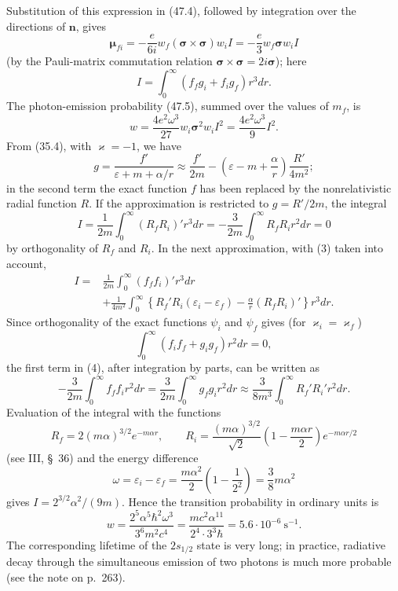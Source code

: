 Substitution of this expression in (47.4), followed by integration over the directions of $\mathbf n$, gives
\[
\boldsymbol\mu_{fi}=-\frac e{6i}w_f(\boldsymbol\sigma\times\boldsymbol\sigma)w_i I
=-\frac e3w_f\boldsymbol\sigma w_i I
\]
(by the Pauli-matrix commutation relation $\boldsymbol\sigma\times\boldsymbol\sigma=2i\boldsymbol\sigma$); here
\begin{equation}
I=\int_0^\infty(f_fg_i+f_ig_f)r^3dr.
\tag{1}
\end{equation}
The photon-emission probability (47.5), summed over the values of $m_f$, is
\begin{equation}
w=\frac{4e^2\omega^3}{27}w_i\boldsymbol\sigma^2w_iI^2
=\frac{4e^2\omega^3}{9}I^2.
\tag{2}
\end{equation}
From (35.4), with $\varkappa=-1$, we have
\[
g=\frac{f'}{\varepsilon+m+\alpha/r}
\approx\frac{f'}{2m}-\left(\varepsilon-m+\frac\alpha r\right)\frac{R'}{4m^2};
\]
in the second term the exact function $f$ has been replaced by the nonrelativistic radial function $R$. If the approximation is restricted to $g=R'/2m$, the integral
\begin{equation}
I=\frac1{2m}\int_0^\infty(R_fR_i)'r^3dr
=-\frac3{2m}\int_0^\infty R_fR_ir^2dr=0
\tag{3}
\end{equation}
by orthogonality of $R_f$ and $R_i$. In the next approximation, with (3) taken into account,
\begin{equation}
\begin{aligned}
I={}&\frac1{2m}\int_0^\infty(f_ff_i)'r^3dr\\
&+\frac1{4m^2}\int_0^\infty
\left\{R_f'R_i(\varepsilon_i-\varepsilon_f)
-\frac\alpha r(R_fR_i)'\right\}r^3dr.
\end{aligned}
\tag{4}
\end{equation}
Since orthogonality of the exact functions $\psi_i$ and $\psi_f$ gives (for $\varkappa_i=\varkappa_f$)
\[
\int_0^\infty(f_if_f+g_ig_f)r^2dr=0,
\]
the first term in (4), after integration by parts, can be written as
\[
-\frac3{2m}\int_0^\infty f_ff_ir^2dr
=\frac3{2m}\int_0^\infty g_fg_ir^2dr
\approx\frac3{8m^3}\int_0^\infty R_f'R_i'r^2dr.
\]
Evaluation of the integral with the functions
\[
R_f=2(m\alpha)^{3/2}e^{-m\alpha r},
\qquad
R_i=\frac{(m\alpha)^{3/2}}{\sqrt2}
\left(1-\frac{m\alpha r}{2}\right)e^{-m\alpha r/2}
\]
(see III, \S~36) and the energy difference
\[
\omega=\varepsilon_i-\varepsilon_f
=\frac{m\alpha^2}{2}\left(1-\frac1{2^2}\right)
=\frac38m\alpha^2
\]
gives $I=2^{3/2}\alpha^2/(9m)$. Hence the transition probability in ordinary units is
\[
w=\frac{2^5\alpha^5\hbar^2\omega^3}{3^6m^2c^4}
=\frac{mc^2\alpha^{11}}{2^4\cdot3^3\hbar}
=5.6\cdot10^{-6}\ \mathrm{s}^{-1}.
\]
The corresponding lifetime of the $2s_{1/2}$ state is very long; in practice, radiative decay through the simultaneous emission of two photons is much more probable (see the note on p.~263).
